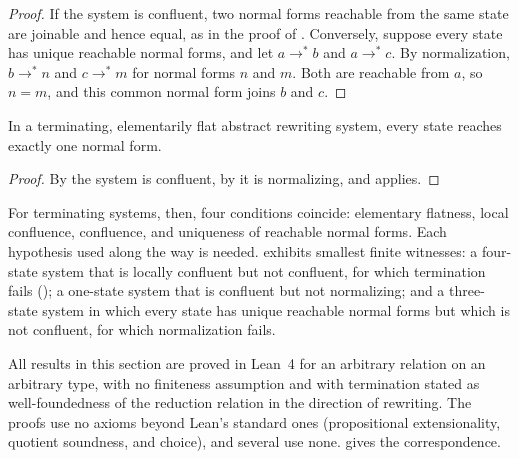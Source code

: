 \begin{proof}
If the system is confluent, two normal forms reachable from the same state are joinable and hence equal, as in the proof of . Conversely, suppose every state has unique reachable normal forms, and let $a \to^{*} b$ and $a \to^{*} c$. By normalization, $b \to^{*} n$ and $c \to^{*} m$ for normal forms $n$ and $m$. Both are reachable from $a$, so $n = m$, and this common normal form joins $b$ and $c$.
\end{proof}

\begin{corollary}
\label{cor:terminating-flat-unique-nf}
In a terminating, elementarily flat abstract rewriting system, every state reaches exactly one normal form.
\end{corollary}

\begin{proof}
By  the system is confluent, by  it is normalizing, and  applies.
\end{proof}

For terminating systems, then, four conditions coincide: elementary flatness, local confluence, confluence, and uniqueness of reachable normal forms. Each hypothesis used along the way is needed.  exhibits smallest finite witnesses: a four-state system that is locally confluent but not confluent, for which termination fails (); a one-state system that is confluent but not normalizing; and a three-state system in which every state has unique reachable normal forms but which is not confluent, for which normalization fails.

\begin{remark}[Mechanization]
\label{rem:lean-formal-core-crossref}
All results in this section are proved in Lean~4 for an arbitrary relation on an arbitrary type, with no finiteness assumption and with termination stated as well-foundedness of the reduction relation in the direction of rewriting. The proofs use no axioms beyond Lean's standard ones (propositional extensionality, quotient soundness, and choice), and several use none.  gives the correspondence.
\end{remark}

